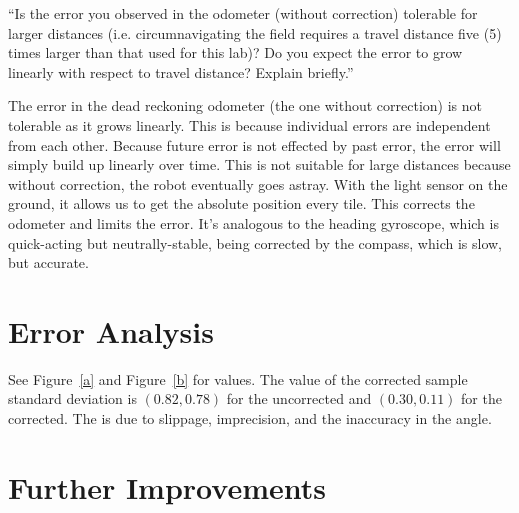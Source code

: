 \documentclass[twocolumn]{article}
\begin{document}
``Is the error you observed in the odometer (without correction) tolerable for larger distances (i.e. circumnavigating the field requires a travel distance five (5) times larger than that used for this lab)? Do you expect the error to grow linearly with respect to travel distance? Explain briefly.\cite{lab2}''

The error in the dead reckoning odometer (the one without correction) is not tolerable as it grows linearly. This is because individual errors are independent from each other. Because future error is not effected by past error, the error will simply build up linearly over time. This is not suitable for large distances because without correction, the robot eventually goes astray. With the light sensor on the ground, it allows us to get the absolute position every tile. This corrects the odometer and limits the error. It's analogous to the heading gyroscope, which is quick-acting but neutrally-stable, being corrected by the compass, which is slow, but accurate.

\section{Error Analysis}

See Figure~\ref{a} and Figure~\ref{b} for values. The value
of the corrected sample standard deviation is $(0.82, 0.78)$ for
the uncorrected and $(0.30, 0.11)$ for the corrected. The is due to slippage, imprecision, and the inaccuracy in the angle.

\section{Further Improvements}
\end{document}
